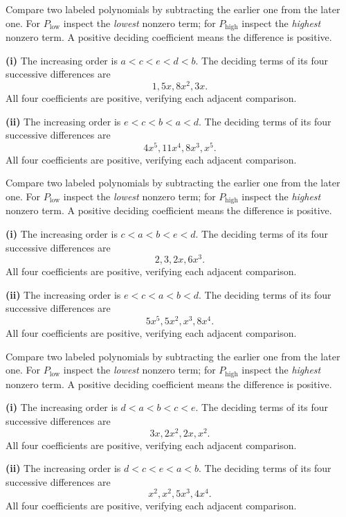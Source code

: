 Compare two labeled polynomials by subtracting the earlier one from the later one. For $P_{\mathrm{low}}$ inspect the \emph{lowest} nonzero term; for $P_{\mathrm{high}}$ inspect the \emph{highest} nonzero term. A positive deciding coefficient means the difference is positive.\par
\textbf{(i)} The increasing order is $\boxed{a<c<e<d<b}$. The deciding terms of its four successive differences are
\[1, 5x, 8x^{2}, 3x.
\]
All four coefficients are positive, verifying each adjacent comparison.\par
\textbf{(ii)} The increasing order is $\boxed{e<c<b<a<d}$. The deciding terms of its four successive differences are
\[4x^{5}, 11x^{4}, 8x^{3}, x^{5}.
\]
All four coefficients are positive, verifying each adjacent comparison.\par


Compare two labeled polynomials by subtracting the earlier one from the later one. For $P_{\mathrm{low}}$ inspect the \emph{lowest} nonzero term; for $P_{\mathrm{high}}$ inspect the \emph{highest} nonzero term. A positive deciding coefficient means the difference is positive.\par
\textbf{(i)} The increasing order is $\boxed{c<a<b<e<d}$. The deciding terms of its four successive differences are
\[2, 3, 2x, 6x^{3}.
\]
All four coefficients are positive, verifying each adjacent comparison.\par
\textbf{(ii)} The increasing order is $\boxed{e<c<a<b<d}$. The deciding terms of its four successive differences are
\[5x^{5}, 5x^{2}, x^{3}, 8x^{4}.
\]
All four coefficients are positive, verifying each adjacent comparison.\par


Compare two labeled polynomials by subtracting the earlier one from the later one. For $P_{\mathrm{low}}$ inspect the \emph{lowest} nonzero term; for $P_{\mathrm{high}}$ inspect the \emph{highest} nonzero term. A positive deciding coefficient means the difference is positive.\par
\textbf{(i)} The increasing order is $\boxed{d<a<b<c<e}$. The deciding terms of its four successive differences are
\[3x, 2x^{2}, 2x, x^{2}.
\]
All four coefficients are positive, verifying each adjacent comparison.\par
\textbf{(ii)} The increasing order is $\boxed{d<c<e<a<b}$. The deciding terms of its four successive differences are
\[x^{2}, x^{2}, 5x^{3}, 4x^{4}.
\]
All four coefficients are positive, verifying each adjacent comparison.\par


